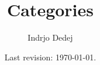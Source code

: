 



\title{Categories}
\author{Indrjo Dedej}
\date{Last revision: \today{}.}



\maketitle

\tableofcontents









